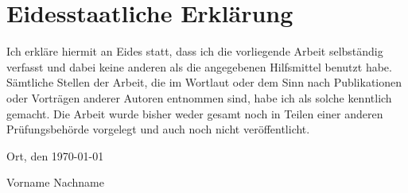 \section*{Eidesstaatliche Erklärung}

Ich erkläre hiermit an Eides statt, dass ich die vorliegende Arbeit selbständig verfasst und dabei keine anderen als die angegebenen Hilfsmittel benutzt habe. Sämtliche Stellen der Arbeit, die im Wortlaut oder dem Sinn nach Publikationen oder Vorträgen anderer Autoren entnommen sind, habe ich als solche kenntlich gemacht. Die Arbeit wurde bisher weder gesamt noch in Teilen einer anderen Prüfungsbehörde vorgelegt und auch noch nicht veröffentlicht.

\vspace{1.5cm}

\begin{flushright}
    Ort, den \today

    \vspace{0.7cm}
    Vorname Nachname
\end{flushright}
